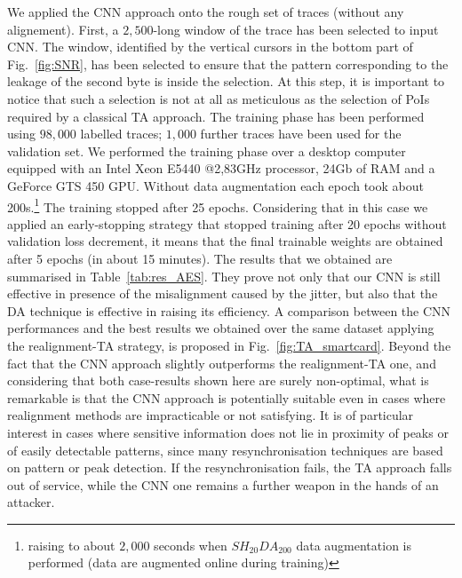 We applied the CNN approach onto the rough set of traces (without any alignement). First, a $2,500$-long window of the trace has been selected to input CNN. The window, identified by the vertical cursors in the bottom part of Fig.~\ref{fig:SNR}, has been selected to ensure that the pattern corresponding to the leakage of the second byte is inside the selection. At this step, it is important to notice that such a selection is not at all  as meticulous as the selection of PoIs required by a classical TA approach. The training phase has been performed using $98,000$ labelled traces; $1,000$ further traces have been used for the validation set. We performed the training phase over a desktop computer equipped with an Intel Xeon E5440 @2,83GHz processor, 24Gb of RAM and a GeForce GTS 450 GPU. Without data augmentation each epoch took about 200s.\footnote{raising to about $2,000$ seconds when $SH_{20}DA_{200}$ data augmentation is performed (data are augmented online during training)} The training stopped after 25 epochs. Considering that in this case we applied an early-stopping strategy that stopped training after 20 epochs without validation loss decrement, it means that the final trainable weights are obtained after 5 epochs (in about 15 minutes). The results that we obtained are summarised in Table~\ref{tab:res_AES}. They prove not only that our CNN is still effective in presence of the misalignment caused by the jitter, but also that the DA technique is effective in raising its efficiency. A comparison between the CNN performances and the best results we obtained over the same dataset applying the realignment-TA strategy, is proposed in Fig.~\ref{fig:TA_smartcard}. Beyond the fact that the CNN approach slightly outperforms the realignment-TA one, and considering that both case-results shown here are surely non-optimal, what is remarkable is that the CNN approach is potentially suitable even in cases where realignment methods are impracticable or not satisfying. It is of particular interest in cases where sensitive information does not lie in proximity of peaks or of easily detectable patterns, since many resynchronisation techniques are based on pattern or peak detection. If the resynchronisation fails, the TA approach falls out of service, while the CNN one remains a further weapon in the hands of an attacker.

